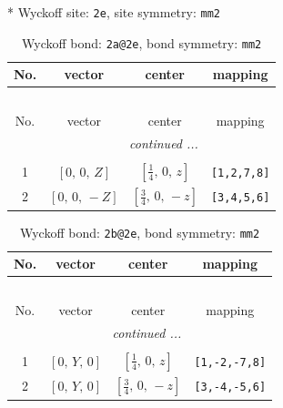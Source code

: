 \documentclass[fleqn,8pt]{jsarticle}
\begin{document}
* Wyckoff site: {\tt 2e}, site symmetry: {\tt mm2}
\renewcommand{\arraystretch}{1.2}
\begin{longtable}{cccc}
\caption{Wyckoff bond: {\tt 2a@2e}, bond symmetry: {\tt mm2}}
 \\
 \hline \hline
No. & vector & center & mapping \\ \hline \endfirsthead

\multicolumn{3}{l}{\tablename\ \thetable{}} \\
 \hline \hline
No. & vector & center & mapping \\ \hline \endhead

 \hline \hline
\multicolumn{3}{r}{\footnotesize\it continued ...} \\ \endfoot

 \hline \hline
\multicolumn{3}{r}{} \\ \endlastfoot

1 & $\left[ 0,\, 0,\, Z \right]$ & $\left[ \frac{1}{4},\, 0,\, z \right]$ & {\tt [1,2,7,8]} \\ \hline
2 & $\left[ 0,\, 0,\, - Z \right]$ & $\left[ \frac{3}{4},\, 0,\, - z \right]$ & {\tt [3,4,5,6]} \\
\end{longtable}
\renewcommand{\arraystretch}{1.2}
\begin{longtable}{cccc}
\caption{Wyckoff bond: {\tt 2b@2e}, bond symmetry: {\tt mm2}}
 \\
 \hline \hline
No. & vector & center & mapping \\ \hline \endfirsthead

\multicolumn{3}{l}{\tablename\ \thetable{}} \\
 \hline \hline
No. & vector & center & mapping \\ \hline \endhead

 \hline \hline
\multicolumn{3}{r}{\footnotesize\it continued ...} \\ \endfoot

 \hline \hline
\multicolumn{3}{r}{} \\ \endlastfoot

1 & $\left[ 0,\, Y,\, 0 \right]$ & $\left[ \frac{1}{4},\, 0,\, z \right]$ & {\tt [1,-2,-7,8]} \\ \hline
2 & $\left[ 0,\, Y,\, 0 \right]$ & $\left[ \frac{3}{4},\, 0,\, - z \right]$ & {\tt [3,-4,-5,6]} \\
\end{longtable}
\renewcommand{\arraystretch}{1.2}
\end{document}
